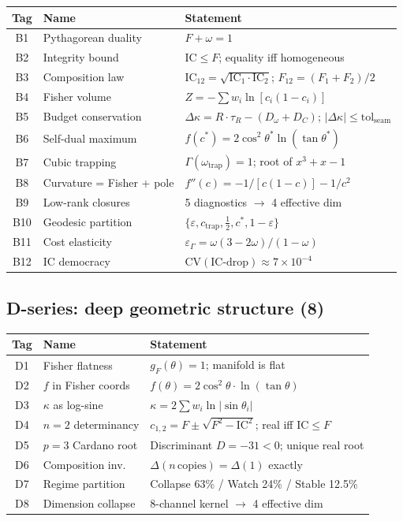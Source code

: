 \documentclass[
  aps,
  prd,
  twocolumn,
  superscriptaddress,
  nofootinbib,
  floatfix
]{revtex4-2}
\newcommand{\tR}{\tau_{\!R}}
\newcommand{\Gam}{\Gamma}
\newcommand{\eps}{\varepsilon}
\newcommand{\tolseam}{\mathrm{tol}_{\mathrm{seam}}}
\newcommand{\IC}{\mathrm{IC}}
\newcommand{\gF}{g_{\!F}}
\begin{document}
\begin{center}
{\small\begin{tabular}{@{}clp{3.7cm}@{}}
\toprule
\textbf{Tag} & \textbf{Name} & \textbf{Statement} \\
\midrule
B1 & Pythagorean duality & $F + \omega = 1$ \\
B2 & Integrity bound & $\IC \leq F$; equality iff homogeneous \\
B3 & Composition law & $\IC_{12} = \sqrt{\IC_1 \cdot \IC_2}$; $F_{12} = (F_1{+}F_2)/2$ \\
B4 & Fisher volume & $Z = -\sum w_i \ln[c_i(1{-}c_i)]$ \\
B5 & Budget conservation & $\Delta\kappa = R \cdot \tR - (D_\omega{+}D_C)$; $|\Delta\kappa| \leq \tolseam$ \\
B6 & Self-dual maximum & $f(c^*) = 2\cos^2\theta^* \ln(\tan\theta^*)$ \\
B7 & Cubic trapping & $\Gam(\omega_\mathrm{trap}) = 1$; root of $x^3{+}x{-}1$ \\
B8 & Curvature = Fisher + pole & $f''(c) = -1/[c(1{-}c)] - 1/c^2$ \\
B9 & Low-rank closures & 5 diagnostics $\to$ 4 effective dim \\
B10 & Geodesic partition & $\{\eps, c_\mathrm{trap}, \tfrac{1}{2}, c^*, 1{-}\eps\}$ \\
B11 & Cost elasticity & $\varepsilon_\Gam = \omega(3{-}2\omega)/(1{-}\omega)$ \\
B12 & IC democracy & $\mathrm{CV}(\text{IC-drop}) \approx 7{\times}10^{-4}$ \\
\bottomrule
\end{tabular}}
\end{center}

\subsection{D-series: deep geometric structure (8)}

\begin{center}
{\small\begin{tabular}{@{}clp{4.2cm}@{}}
\toprule
\textbf{Tag} & \textbf{Name} & \textbf{Statement} \\
\midrule
D1 & Fisher flatness & $\gF(\theta) = 1$; manifold is flat \\
D2 & $f$ in Fisher coords & $f(\theta) = 2\cos^2\theta \cdot \ln(\tan\theta)$ \\
D3 & $\kappa$ as log-sine & $\kappa = 2\sum w_i \ln|\sin\theta_i|$ \\
D4 & $n{=}2$ determinancy & $c_{1,2} = F \pm \sqrt{F^2 - \IC^2}$; real iff $\IC \leq F$ \\
D5 & $p{=}3$ Cardano root & Discriminant $D = -31 < 0$; unique real root \\
D6 & Composition inv.\ & $\Delta(n\,\mathrm{copies}) = \Delta(1)$ exactly \\
D7 & Regime partition & Collapse 63\% / Watch 24\% / Stable 12.5\% \\
D8 & Dimension collapse & 8-channel kernel $\to$ 4 effective dim \\
\bottomrule
\end{tabular}}
\end{center}
\end{document}
